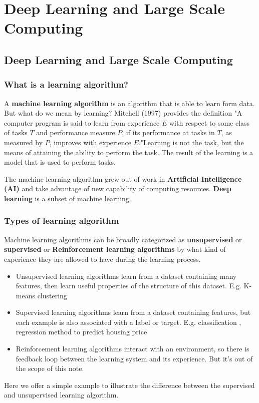 \chapter{Deep Learning and Large Scale Computing}
\section{Deep Learning and Large Scale Computing}
	\subsection{What is a learning algorithm?}
		
		A \textbf{machine learning algorithm} is an algorithm that is able to learn form data. But	what do we mean by learning? Mitchell (1997) provides the definition "A computer program is said to learn from experience $E$	with respect to some class of tasks	$T$	and performance measure	$P$, if its performance at tasks in	$T$, as measured by $P$, improves with experience $E$."Learning is not the task, but the means of attaining the ability to perform the task. The result of the learning is a model that is used to perform tasks.
		
		The machine learning algorithm grew out of work in \textbf{Artificial Intelligence (AI)} and take advantage of new capability of computing resources. \textbf{Deep learning} is a subset of machine learning.

	\subsection{Types of learning algorithm}
		
		 Machine learning algorithms can be broadly categorized as \textbf{unsupervised} or \textbf{supervised} or \textbf{Reinforcement learning algorithms
		 }	by what kind of experience they are allowed to have during the learning process.
	\begin{itemize}		
		\item Unsupervised learning algorithms learn from a dataset containing many features, then learn useful properties of the structure of this dataset. E.g. K-means clustering	
		\item Supervised learning algorithms learn from a dataset containing features, but each example is also associated with a label or target. E.g. classification , regression method to predict housing price	
		\item Reinforcement learning algorithms interact with an environment, so there is feedback loop between the learning system and its experience. But it's out of the scope of this note.		
	\end{itemize}	
	Here we offer a simple example to illustrate the difference between the supervised and unsupervised learning algorithm.
	
